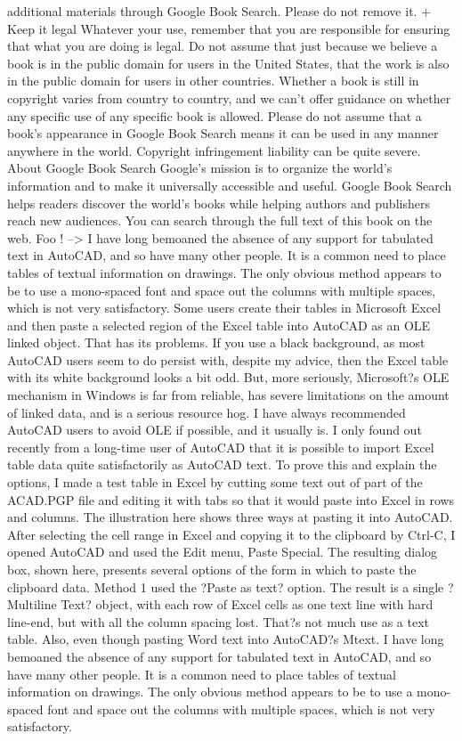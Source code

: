 \documentclass[a4paper]{article}
\begin{document}
additional materials through Google Book Search. Please do not remove it. 
+ Keep it legal Whatever your use, remember that you are responsible for ensuring that what you are doing is legal. Do not assume that just 
because we believe a book is in the public domain for users in the United States, that the work is also in the public domain for users in other 
countries. Whether a book is still in copyright varies from country to country, and we can't offer guidance on whether any specific use of 
any specific book is allowed. Please do not assume that a book's appearance in Google Book Search means it can be used in any manner 
anywhere in the world. Copyright infringement liability can be quite severe. 
About Google Book Search 
Google's mission is to organize the world's information and to make it universally accessible and useful. Google Book Search helps readers 
discover the world's books while helping authors and publishers reach new audiences. You can search through the full text of this book on the web. Foo ! --> I have long bemoaned the absence of any support for tabulated text in AutoCAD, and so have many other people. It is a common need to place tables of textual information on drawings. The only obvious method appears to be to use a mono-spaced font and space out the columns with multiple spaces, which is not very satisfactory.
Some users create their tables in Microsoft Excel and then paste a selected region of the Excel table into AutoCAD as an OLE linked object. That has its problems. If you use a black background, as most AutoCAD users seem to do persist with, despite my advice, then the Excel table with its white background looks a bit odd. But, more seriously, Microsoft?s OLE mechanism in Windows is far from reliable, has severe limitations on the amount of linked data, and is a serious resource hog. I have always recommended AutoCAD users to avoid OLE if possible, and it usually is.
I only found out recently from a long-time user of AutoCAD that it is possible to import Excel table data quite satisfactorily as AutoCAD text. To prove this and explain the options, I made a test table in Excel by cutting some text out of part of the ACAD.PGP file and editing it with tabs so that it would paste into Excel in rows and columns. The illustration here shows three ways at pasting it into AutoCAD. After selecting the cell range in Excel and copying it to the clipboard by Ctrl-C, I opened AutoCAD and used the Edit menu, Paste Special. The resulting dialog box, shown here, presents several options of the form in which to paste the clipboard data.
Method 1 used the ?Paste as text? option. The result is a single ?Multiline Text? object, with each row of Excel cells as one text line with hard line-end, but with all the column spacing lost. That?s not much use as a text table. Also, even though pasting Word text into AutoCAD?s Mtext. I have long bemoaned the absence of any support for tabulated text in AutoCAD, and so have many other people. It is a common need to place tables of textual information on drawings. The only obvious method appears to be to use a mono-spaced font and space out the columns with multiple spaces, which is not very satisfactory.
\end{document}
